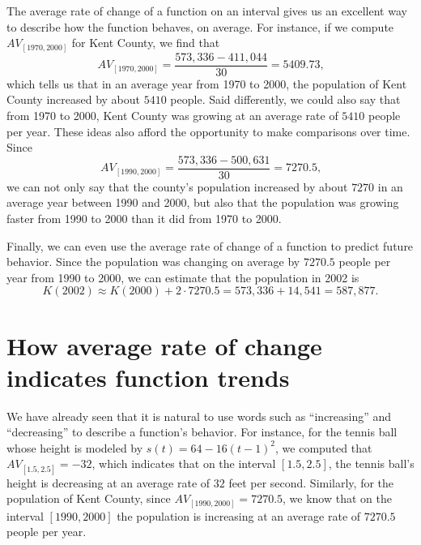 \documentclass[nooutcomes]{ximera}
\begin{document}
The average rate of change of a function on an interval gives us an excellent way to describe how the function behaves, on average.  For instance, if we compute \(AV_{[1970,2000]}\) for Kent County, we find that%
\begin{equation*}
AV_{[1970,2000]} = \frac{573,336 - 411,044}{30} = 5409.73\text{,}
\end{equation*}
which tells us that in an average year from 1970 to 2000, the population of Kent County increased by about \(5410\) people.  Said differently, we could also say that from 1970 to 2000, Kent County was growing at an average rate of \(5410\) people per year.  These ideas also afford the opportunity to make comparisons over time.  Since%
\begin{equation*}
AV_{[1990,2000]} = \frac{573,336 - 500,631}{30} = 7270.5\text{,}
\end{equation*}
we can not only say that the county's population increased by about \(7270\) in an average year between 1990 and 2000, but also that the population was growing faster from 1990 to 2000 than it did from 1970 to 2000.%

Finally, we can even use the average rate of change of a function to predict future behavior.  Since the population was changing on average by \(7270.5\) people per year from 1990 to 2000, we can estimate that the population in 2002 is%
\begin{equation*}
K(2002) \approx K(2000) + 2 \cdot 7270.5 = 573,336 + 14,541 = 587,877\text{.}
\end{equation*}



\section{How average rate of change indicates function trends}

We have already seen that it is natural to use words such as ``increasing'' and ``decreasing'' to describe a function's behavior.  For instance, for the tennis ball whose height is modeled by \(s(t) = 64 - 16(t-1)^2\), we computed that \(AV_{[1.5,2.5]} = -32\), which indicates that on the interval \([1.5,2.5]\), the tennis ball's height is decreasing at an average rate of \(32\) feet per second.  Similarly, for the population of Kent County, since \(AV_{[1990,2000]} = 7270.5\), we know that on the interval \([1990,2000]\) the population is increasing at an average rate of \(7270.5\) people per year.
\end{document}
